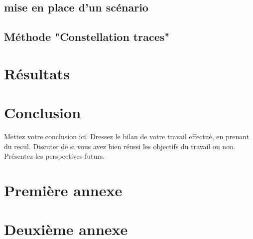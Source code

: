 \documentclass[12pt,a4paper,oneside, titlepage]{report}
\begin{document}
\section{mise en place d'un scénario}

\section{Méthode "Constellation traces"}

\chapter{Résultats}





\chapter*{Conclusion}
\renewcommand{\leftmark}{CONCLUSION}

Mettez votre conclusion ici.  Dressez le bilan de votre travail effectué, en prenant du recul. Discuter de si vous avez bien réussi les objectifs du travail ou non. Présentez les perspectives futurs.






\newpage
\appendix
{}

\chapter{Premi\`ere annexe}
\renewcommand{\leftmark}{ANNEXE \thechapter.~~Premi\`ere annexe}
\label{annexe1}

\chapter{Deuxi\`eme annexe}
\renewcommand{\leftmark}{ANNEXE \thechapter.~~Deuxi\`eme annexe}
\label{annexe2}

\end{document}
